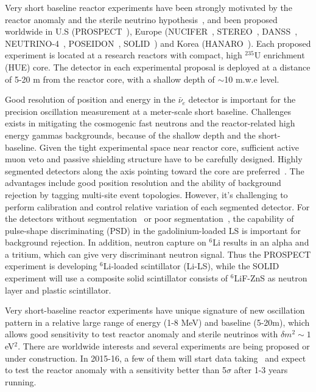 Very short baseline reactor experiments have been strongly motivated by the reactor anomaly and the sterile neutrino hypothesis~\cite{sterileWP}, and been proposed worldwide in U.S (PROSPECT~\cite{PROSPECT}), Europe (NUCIFER~\cite{NUCIFER-2010, NUCIFER-2014}, STEREO~\cite{NUCIFER-2014}, DANSS~\cite{DANSS}, NEUTRINO-4~\cite{NEUTRINO4-2012,NEUTRINO4-2014}, POSEIDON~\cite{POSEIDON}, SOLID~\cite{SoLid}) and Korea (HANARO~\cite{HANARO}). Each proposed experiment is located at a research reactors with compact, high $^{235}$U enrichment (HUE) core. The detector in each experimental proposal is deployed at a distance of 5-20 m from the reactor core, with a shallow depth of $\sim$10 m.w.e level.

Good resolution of position and energy in the $\bar\nu_e$ detector is important for the precision oscillation measurement at a meter-scale short baseline. Challenges exists in mitigating the cosmogenic fast neutrons and the reactor-related high energy gammas backgrounds, because of the shallow depth and the short-baseline. Given the tight experimental space near reactor core, sufficient active muon veto and passive shielding structure have to be carefully designed. Highly segmented detectors along the axis pointing toward the core are preferred~\cite{PROSPECT,DANSS,SoLid,HANARO}. The advantages include good position resolution and the ability of background rejection by tagging multi-site event topologies. However, it's challenging to perform calibration and control relative variation of each segmented detector. For the detectors without segmentation~\cite{NUCIFER-2010,NEUTRINO4-2014,POSEIDON} or poor segmentation~\cite{NUCIFER-2014}, the capability of pulse-shape discriminating (PSD) in the gadolinium-loaded LS is important for background rejection. In addition, neutron capture on $^6$Li results in an alpha and a tritium, which can give very discriminant neutron signal. Thus the PROSPECT experiment is developing $^6$Li-loaded scintillator (Li-LS), while the SOLID experiment will use a composite solid scintillator consists of $^6$LiF-ZnS as neutron layer and plastic scintillator.

Very short-baseline reactor experiments have unique signature of new oscillation pattern in a relative large range of energy (1-8 MeV) and baseline (5-20m), which allows good sensitivity to test reactor anomaly and sterile neutrinos with $\delta m^2\sim1$eV$^2$. There are worldwide interests and several experiments are being proposed or under construction. In 2015-16, a few of them will start data taking~\cite{Lhuillier-Neutrino14} and expect to test the reactor anomaly with a sensitivity better than 5$\sigma$ after 1-3 years running.


